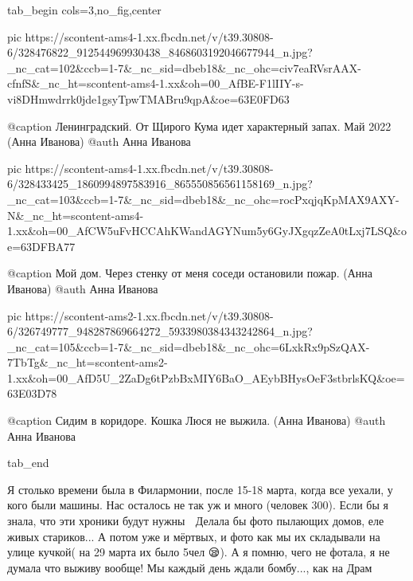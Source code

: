  
 
 
 
 

\clearpage
{}

\ifcmt
  tab_begin cols=3,no_fig,center

     pic https://scontent-ams4-1.xx.fbcdn.net/v/t39.30808-6/328476822_912544969930438_8468603192046677944_n.jpg?_nc_cat=102&ccb=1-7&_nc_sid=dbeb18&_nc_ohc=civ7eaRVsrAAX-cfnfS&_nc_ht=scontent-ams4-1.xx&oh=00_AfBE-F1lIIY-s-vi8DHmwdrrk0jde1gsyTpwTMABru9qpA&oe=63E0FD63

     @caption Ленинградский. От Щирого Кума идет характерный запах. Май 2022 (Анна Иванова)
     @auth Анна Иванова

     pic https://scontent-ams4-1.xx.fbcdn.net/v/t39.30808-6/328433425_1860994897583916_865550856561158169_n.jpg?_nc_cat=103&ccb=1-7&_nc_sid=dbeb18&_nc_ohc=rocPxqjqKpMAX9AXY-N&_nc_ht=scontent-ams4-1.xx&oh=00_AfCW5uFvHCCAhKWandAGYNum5y6GyJXgqzZeA0tLxj7LSQ&oe=63DFBA77

     @caption Мой дом. Через стенку от меня соседи остановили пожар. (Анна Иванова)
     @auth Анна Иванова

     pic https://scontent-ams2-1.xx.fbcdn.net/v/t39.30808-6/326749777_948287869664272_5933980384343242864_n.jpg?_nc_cat=105&ccb=1-7&_nc_sid=dbeb18&_nc_ohc=6LxkRx9pSzQAX-7TbTg&_nc_ht=scontent-ams2-1.xx&oh=00_AfD5U_2ZaDg6tPzbBxMIY6BaO_AEybBHysOeF3stbrlsKQ&oe=63E03D78

     @caption Сидим в коридоре. Кошка Люся не выжила. (Анна Иванова)
     @auth Анна Иванова

  tab_end
\fi


Я столько времени была в Филармонии, после 15-18 марта, когда все уехали, у
кого были машины. Нас осталось не так уж и много (человек 300). Если бы я знала,
что эти хроники будут нужны 🥺 Делала бы фото пылающих домов, еле живых
стариков... А потом уже и мёртвых, и фото как мы их складывали на улице кучкой(
на 29 марта их было 5чел 😪). А я помню, чего не фотала, я не думала что выживу
вообще! Мы каждый день ждали бомбу..., как на Драм 🥀🥀

